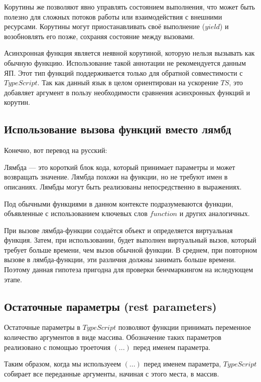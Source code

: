 \documentclass{mipt-thesis-bs}
\begin{document}
Корутины же позволяют явно управлять состоянием выполнения, что может
быть полезно для сложных потоков работы или взаимодействия
с внешними ресурсами. Корутины могут приостанавливать своё
выполнение ($yield$) и возобновлять его позже, сохраняя
состояние между вызовами.

Асинхронная функция является неявной корутиной, которую нельзя
вызывать как обычную функцию. Использование такой аннотации
не рекомендуется данным ЯП. Этот тип функций поддерживается
только для обратной совместимости с $TypeScript$.
Так как данный язык в целом ориентирован на ускорение $TS$, это
добавляет аргумент в пользу необходимости сравнения асинхронных
функций и корутин.

\subsection{Использование вызова функций вместо лямбд}

Конечно, вот перевод на русский:

Лямбда — это короткий блок кода, который принимает параметры
и может возвращать значение. Лямбда похожи на функции, но не требуют имен
в описаниях. Лямбды могут быть реализованы непосредственно в выражениях.

Под обычными функциями в данном контексте подразумеваются
функции, объявленные с использованием ключевых слов $function$
и других аналогичных.

При вызове лямбда-функции создаётся объект и определяется
виртуальная функция. Затем, при использовании, будет
выполнен виртуальный вызов, который требует больше времени,
чем вызов обычной функции. В среднем, при повторном вызове
в лямбда-функции, эти различия должны занимать больше времени.
Поэтому данная гипотеза пригодна для проверки бенчмаркингом
на иследующем этапе.

\subsection{Остаточные параметры (rest parameters)}

Остаточные параметры в $TypeScript$ позволяют функции
принимать переменное количество аргументов в виде массива.
Обозначение таких параметров реализовано с помощью троеточия $(...)$
перед именем параметра.

Таким образом, когда мы используеем $(...)$ перед именем параметра,
$TypeScript$ собирает все переданные аргументы, начиная с этого места, в массив.
\end{document}

